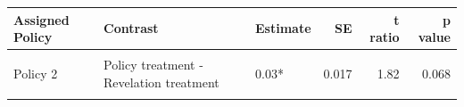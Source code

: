 \centering
\begin{tabular}[t]{lllrrr}
\toprule
Assigned Policy & Contrast & Estimate & SE & t ratio & p value\\
\midrule
\cellcolor{gray!10}{Policy 1} & \cellcolor{gray!10}{Policy treatment - Revelation treatment} & \cellcolor{gray!10}{-0.007} & \cellcolor{gray!10}{0.017} & \cellcolor{gray!10}{-0.44} & \cellcolor{gray!10}{0.664}\\
Policy 2 & Policy treatment - Revelation treatment & 0.03* & 0.017 & 1.82 & 0.068\\
\cellcolor{gray!10}{Policy 3} & \cellcolor{gray!10}{Policy treatment - Revelation treatment} & \cellcolor{gray!10}{0.006} & \cellcolor{gray!10}{0.016} & \cellcolor{gray!10}{0.37} & \cellcolor{gray!10}{0.708}\\
\bottomrule
\end{tabular}
